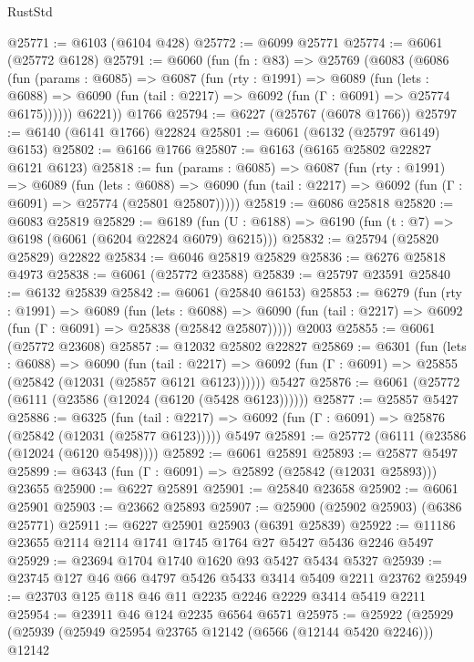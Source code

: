 \begin{lexlean}{RustStd}
\begin{coremodule}
{\begin{coremodule}
{{{{{{{{{{{{{{{{{{{{{{{{{{@25771 := @6103 (@6104 @428)
@25772 := @6099 @25771
@25774 := @6061 (@25772 @6128)
@25791 := @6060
    (fun (fn : @83) =>
    @25769
      (@6083
        (@6086
          (fun (params : @6085) =>
          @6087
            (fun (rty : @1991) =>
            @6089
              (fun (lets : @6088) =>
              @6090 (fun (tail : @2217) => @6092 (fun (Γ : @6091) => @25774 @6175))))))
        @6221))
    @1766
@25794 := @6227 (@25767 (@6078 @1766))
@25797 := @6140 (@6141 @1766) @22824
@25801 := @6061 (@6132 (@25797 @6149) @6153)
@25802 := @6166 @1766
@25807 := @6163 (@6165 @25802 @22827 @6121 @6123)
@25818 := fun (params : @6085) =>
  @6087
    (fun (rty : @1991) =>
    @6089
      (fun (lets : @6088) =>
      @6090 (fun (tail : @2217) => @6092 (fun (Γ : @6091) => @25774 (@25801 @25807)))))
@25819 := @6086 @25818
@25820 := @6083 @25819
@25829 := @6189
    (fun (U : @6188) => @6190 (fun (t : @7) => @6198 (@6061 (@6204 @22824 @6079) @6215)))
@25832 := @25794 (@25820 @25829) @22822
@25834 := @6046 @25819 @25829
@25836 := @6276 @25818 @4973
@25838 := @6061 (@25772 @23588)
@25839 := @25797 @23591
@25840 := @6132 @25839
@25842 := @6061 (@25840 @6153)
@25853 := @6279
    (fun (rty : @1991) =>
    @6089
      (fun (lets : @6088) =>
      @6090 (fun (tail : @2217) => @6092 (fun (Γ : @6091) => @25838 (@25842 @25807)))))
    @2003
@25855 := @6061 (@25772 @23608)
@25857 := @12032 @25802 @22827
@25869 := @6301
    (fun (lets : @6088) =>
    @6090
      (fun (tail : @2217) =>
      @6092 (fun (Γ : @6091) => @25855 (@25842 (@12031 (@25857 @6121 @6123))))))
    @5427
@25876 := @6061 (@25772 (@6111 (@23586 (@12024 (@6120 (@5428 @6123))))))
@25877 := @25857 @5427
@25886 := @6325
    (fun (tail : @2217) => @6092 (fun (Γ : @6091) => @25876 (@25842 (@12031 (@25877 @6123)))))
    @5497
@25891 := @25772 (@6111 (@23586 (@12024 (@6120 @5498))))
@25892 := @6061 @25891
@25893 := @25877 @5497
@25899 := @6343 (fun (Γ : @6091) => @25892 (@25842 (@12031 @25893))) @23655
@25900 := @6227 @25891
@25901 := @25840 @23658
@25902 := @6061 @25901
@25903 := @23662 @25893
@25907 := @25900 (@25902 @25903) (@6386 @25771)
@25911 := @6227 @25901 @25903 (@6391 @25839)
@25922 := @11186 @23655 @2114 @2114 @1741 @1745 @1764 @27 @5427 @5436 @2246 @5497
@25929 := @23694 @1704 @1740 @1620 @93 @5427 @5434 @5327
@25939 := @23745 @127 @46 @66 @4797 @5426 @5433 @3414 @5409 @2211 @23762
@25949 := @23703 @125 @118 @46 @11 @2235 @2246 @2229 @3414 @5419 @2211
@25954 := @23911 @46 @124 @2235 @6564 @6571
@25975 := @25922
    (@25929
      (@25939
        (@25949 @25954 @23765 @12142 (@6566 (@12144 @5420 @2246)))
        @12142
}}}}}}}}}}}}}}}}}}}}}}}}}}
\end{coremodule}}
\end{coremodule}
\end{lexlean}
